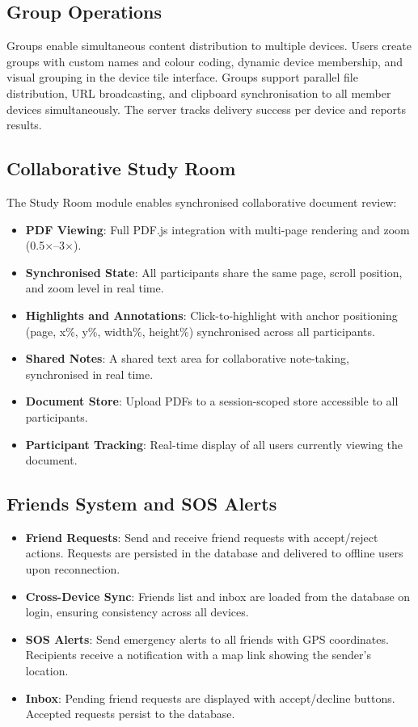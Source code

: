 \documentclass[conference]{IEEEtran}
\begin{document}
\subsection{Group Operations}

Groups enable simultaneous content distribution to multiple devices. Users create groups with custom names and colour coding, dynamic device membership, and visual grouping in the device tile interface. Groups support parallel file distribution, URL broadcasting, and clipboard synchronisation to all member devices simultaneously. The server tracks delivery success per device and reports results.

\subsection{Collaborative Study Room}

The Study Room module enables synchronised collaborative document review:

\begin{itemize}
    \item \textbf{PDF Viewing}: Full PDF.js integration with multi-page rendering and zoom (0.5$\times$--3$\times$).
    \item \textbf{Synchronised State}: All participants share the same page, scroll position, and zoom level in real time.
    \item \textbf{Highlights and Annotations}: Click-to-highlight with anchor positioning (page, x\%, y\%, width\%, height\%) synchronised across all participants.
    \item \textbf{Shared Notes}: A shared text area for collaborative note-taking, synchronised in real time.
    \item \textbf{Document Store}: Upload PDFs to a session-scoped store accessible to all participants.
    \item \textbf{Participant Tracking}: Real-time display of all users currently viewing the document.
\end{itemize}

\subsection{Friends System and SOS Alerts}

\begin{itemize}
    \item \textbf{Friend Requests}: Send and receive friend requests with accept/reject actions. Requests are persisted in the database and delivered to offline users upon reconnection.
    \item \textbf{Cross-Device Sync}: Friends list and inbox are loaded from the database on login, ensuring consistency across all devices.
    \item \textbf{SOS Alerts}: Send emergency alerts to all friends with GPS coordinates. Recipients receive a notification with a map link showing the sender's location.
    \item \textbf{Inbox}: Pending friend requests are displayed with accept/decline buttons. Accepted requests persist to the database.
\end{itemize}
\end{document}
